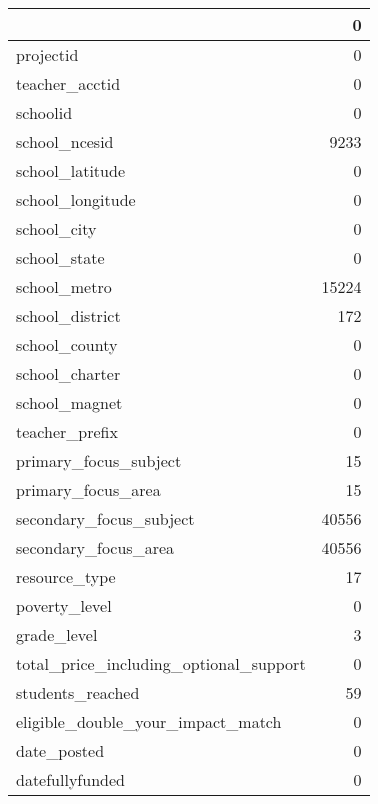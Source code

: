 \begin{tabular}{lr}
\toprule
{} &      0 \\
\midrule
projectid                              &      0 \\
teacher\_acctid                         &      0 \\
schoolid                               &      0 \\
school\_ncesid                          &   9233 \\
school\_latitude                        &      0 \\
school\_longitude                       &      0 \\
school\_city                            &      0 \\
school\_state                           &      0 \\
school\_metro                           &  15224 \\
school\_district                        &    172 \\
school\_county                          &      0 \\
school\_charter                         &      0 \\
school\_magnet                          &      0 \\
teacher\_prefix                         &      0 \\
primary\_focus\_subject                  &     15 \\
primary\_focus\_area                     &     15 \\
secondary\_focus\_subject                &  40556 \\
secondary\_focus\_area                   &  40556 \\
resource\_type                          &     17 \\
poverty\_level                          &      0 \\
grade\_level                            &      3 \\
total\_price\_including\_optional\_support &      0 \\
students\_reached                       &     59 \\
eligible\_double\_your\_impact\_match      &      0 \\
date\_posted                            &      0 \\
datefullyfunded                        &      0 \\
\bottomrule
\end{tabular}
